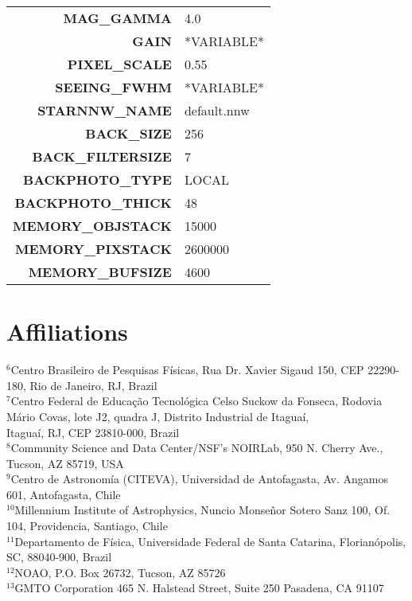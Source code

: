 \documentclass[fleqn,usenatbib]{mnras}
\begin{document}
\begin{table}
\begin{tabular}{rl}
\textbf{MAG\_GAMMA}                & 4.0\\
\textbf{GAIN}                      & *VARIABLE*\\
\textbf{PIXEL\_SCALE}              & 0.55\\
\textbf{SEEING\_FWHM}              & *VARIABLE*\\
\textbf{STARNNW\_NAME}             & default.nnw\\
\textbf{BACK\_SIZE}                & 256\\
\textbf{BACK\_FILTERSIZE}          & 7\\
\textbf{BACKPHOTO\_TYPE}           & LOCAL\\
\textbf{BACKPHOTO\_THICK}          & 48\\
\textbf{MEMORY\_OBJSTACK}          & 15000\\
\textbf{MEMORY\_PIXSTACK}          & 2600000\\
\textbf{MEMORY\_BUFSIZE}           & 4600\\

\hline \hline
\end{tabular}
\end{table}

\section{Affiliations}

$^{6}$Centro Brasileiro de Pesquisas F\'isicas, Rua Dr. Xavier Sigaud 150, CEP 22290-180, Rio de Janeiro, RJ, Brazil\\
$^{7}$Centro Federal de Educa\c{c}\~ao Tecnol\'ogica Celso Suckow da Fonseca, Rodovia M\'ario Covas, lote J2, quadra J, Distrito Industrial de Itagua\'i, \\ Itagua\'i, RJ, CEP 23810-000, Brazil\\
$^{8}$Community Science and Data Center/NSF’s NOIRLab, 950 N. Cherry Ave., Tucson, AZ 85719, USA \\
$^{9}$Centro de Astronom\'{i}a (CITEVA), Universidad de Antofagasta, Av. Angamos 601, Antofagasta, Chile\\
$^{10}$Millennium Institute of Astrophysics, Nuncio Monse\~nor Sotero Sanz 100, Of. 104, Providencia, Santiago, Chile\\
$^{11}$Departamento de F\'isica, Universidade Federal de Santa Catarina, Florian\'{o}polis, SC, 88040-900, Brazil\\
$^{12}$NOAO, P.O. Box 26732, Tucson, AZ 85726\\
$^{13}$GMTO Corporation 465 N. Halstead Street, Suite 250 Pasadena, CA 91107



\bsp	%
\label{lastpage}
\end{document}
